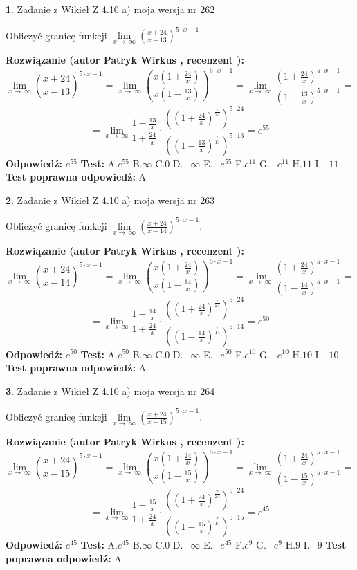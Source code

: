 \documentclass[12pt, a4paper]{article}
\theoremstyle{definition} %
\newtheorem{zad}{}
\newcommand{\zadStart}[1]{\begin{zad}#1\newline}
\newcommand{\zadStop}{\end{zad}}
\newcommand{\rozwStart}[2]{\noindent \textbf{Rozwiązanie (autor #1 , recenzent #2): }\newline}
\newcommand{\rozwStop}{\newline}
\newcommand{\odpStart}{\noindent \textbf{Odpowiedź:}\newline}
\newcommand{\odpStop}{\newline}
\newcommand{\testStart}{\noindent \textbf{Test:}\newline}
\newcommand{\testStop}{\newline}
\newcommand{\kluczStart}{\noindent \textbf{Test poprawna odpowiedź:}\newline}
\newcommand{\kluczStop}{\newline}
\begin{document}
\zadStart{Zadanie z Wikieł Z 4.10 a) moja wersja nr 262}

Obliczyć granicę funkcji  $\lim\limits_{x\to\ \infty}(\frac{x+24}{x-13})^{5\cdot x-1}$.
\zadStop
\rozwStart{Patryk Wirkus}{}
$$\lim\limits_{x\to\ \infty}(\frac{x+24}{x-13})^{5\cdot x-1} = \lim\limits_{x\to\ \infty}(\frac{x(1+\frac{24}{x})}{x(1-\frac{13}{x})})^{5\cdot x-1}=\lim\limits_{x\to\ \infty}\frac{(1+\frac{24}{x})^{5\cdot x-1}}{(1-\frac{13}{x})^{5\cdot x-1}}=$$
$$=\lim\limits_{x\to\ \infty}\frac{1-\frac{13}{x}}{1+\frac{24}{x}}\cdot\frac{((1+\frac{24}{x})^{\frac{x}{24}})^{5\cdot24}}{((1-\frac{13}{x})^{\frac{x}{13}})^{5\cdot13}}=e^{55}$$
\rozwStop
\odpStart
$e^{55}$
\odpStop
\testStart
A.$e^{55}$ B.$\infty$ C.$0$ D.$-\infty$ E.$-e^{55}$
F.$e^{11}$ G.$-e^{11}$
H.$11$
I.$-11$
\testStop
\kluczStart
A
\kluczStop



\zadStart{Zadanie z Wikieł Z 4.10 a) moja wersja nr 263}

Obliczyć granicę funkcji  $\lim\limits_{x\to\ \infty}(\frac{x+24}{x-14})^{5\cdot x-1}$.
\zadStop
\rozwStart{Patryk Wirkus}{}
$$\lim\limits_{x\to\ \infty}(\frac{x+24}{x-14})^{5\cdot x-1} = \lim\limits_{x\to\ \infty}(\frac{x(1+\frac{24}{x})}{x(1-\frac{14}{x})})^{5\cdot x-1}=\lim\limits_{x\to\ \infty}\frac{(1+\frac{24}{x})^{5\cdot x-1}}{(1-\frac{14}{x})^{5\cdot x-1}}=$$
$$=\lim\limits_{x\to\ \infty}\frac{1-\frac{14}{x}}{1+\frac{24}{x}}\cdot\frac{((1+\frac{24}{x})^{\frac{x}{24}})^{5\cdot24}}{((1-\frac{14}{x})^{\frac{x}{14}})^{5\cdot14}}=e^{50}$$
\rozwStop
\odpStart
$e^{50}$
\odpStop
\testStart
A.$e^{50}$ B.$\infty$ C.$0$ D.$-\infty$ E.$-e^{50}$
F.$e^{10}$ G.$-e^{10}$
H.$10$
I.$-10$
\testStop
\kluczStart
A
\kluczStop



\zadStart{Zadanie z Wikieł Z 4.10 a) moja wersja nr 264}

Obliczyć granicę funkcji  $\lim\limits_{x\to\ \infty}(\frac{x+24}{x-15})^{5\cdot x-1}$.
\zadStop
\rozwStart{Patryk Wirkus}{}
$$\lim\limits_{x\to\ \infty}(\frac{x+24}{x-15})^{5\cdot x-1} = \lim\limits_{x\to\ \infty}(\frac{x(1+\frac{24}{x})}{x(1-\frac{15}{x})})^{5\cdot x-1}=\lim\limits_{x\to\ \infty}\frac{(1+\frac{24}{x})^{5\cdot x-1}}{(1-\frac{15}{x})^{5\cdot x-1}}=$$
$$=\lim\limits_{x\to\ \infty}\frac{1-\frac{15}{x}}{1+\frac{24}{x}}\cdot\frac{((1+\frac{24}{x})^{\frac{x}{24}})^{5\cdot24}}{((1-\frac{15}{x})^{\frac{x}{15}})^{5\cdot15}}=e^{45}$$
\rozwStop
\odpStart
$e^{45}$
\odpStop
\testStart
A.$e^{45}$ B.$\infty$ C.$0$ D.$-\infty$ E.$-e^{45}$
F.$e^{9}$ G.$-e^{9}$
H.$9$
I.$-9$
\testStop
\kluczStart
A
\kluczStop
\end{document}
